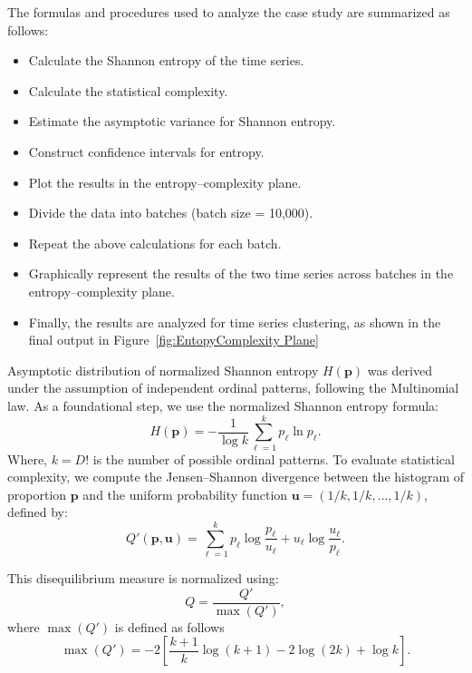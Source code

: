 The formulas and procedures used to analyze the case study are summarized as follows:
\begin{itemize}
	\item Calculate the Shannon entropy of the time series.
	\item Calculate the statistical complexity.
	\item Estimate the asymptotic variance for Shannon entropy.
	\item Construct confidence intervals for entropy.
	\item Plot the results in the entropy–complexity plane.
	\item Divide the data into batches (batch size = 10,000).
	\item Repeat the above calculations for each batch.
	\item Graphically represent the results of the two time series across batches in the entropy–complexity plane.
	\item Finally, the results are analyzed for time series clustering, as shown in the final output in Figure~\ref{fig:EntopyComplexity Plane}
\end{itemize}

Asymptotic distribution of normalized Shannon entropy $H(\mathbf{p})$ was derived under the assumption of independent ordinal patterns, following the Multinomial law. As a foundational step, we use the normalized Shannon entropy formula: 
\begin{equation}
	H(\mathbf{p})=-\dfrac{1}{\log k}\sum^{k}_{\ell=1}p_{\ell} \ln{p_{\ell}}.
\end{equation}
Where, $k=D!$ is the number of possible ordinal patterns. To evaluate statistical complexity, we compute the Jensen–Shannon divergence between the histogram of proportion $\mathbf{p}$ and the uniform probability function $\mathbf{u}=(1/k, 1/k, \dots, 1/k)$, defined by:  
\begin{equation}
	Q'(\mathbf{p,u})=\sum^k_{\ell=1} p_\ell\log\dfrac{p_\ell}{u_\ell}+u_\ell\log\dfrac{u_\ell}{p_\ell}.
\end{equation}

This disequilibrium measure is normalized using:
\begin{equation}
	Q=\dfrac{Q'}{\max{(Q')}},
\end{equation}
where $\max(Q')$ is defined as follows
\begin{equation}
	\max(Q')=-2 \left[\dfrac{k+1}{k}\log(k+1)-2\log(2k)+\log k\right].
\end{equation}

